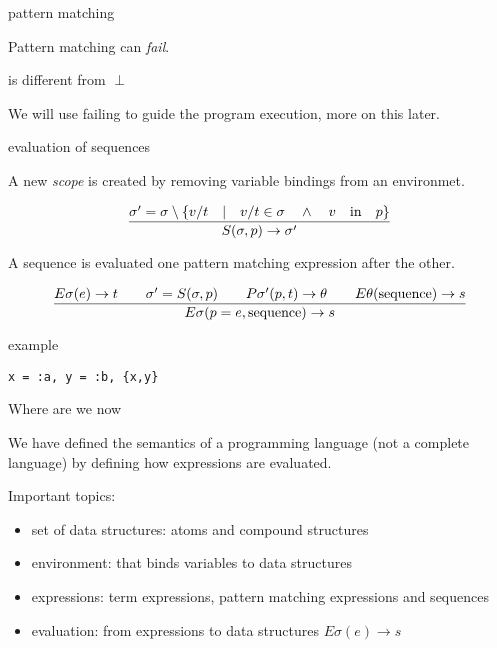 \begin{frame}{pattern matching}

\pause Pattern matching can {\em fail}. 

\pause\vspace{20pt}{\em fail} is different from $\perp$

We will use failing to guide the program execution, more on this later.

\end{frame}

\begin{frame}{evaluation of sequences}

  \pause  A new {\em scope} is created by removing variable bindings from an environmet.

  \vspace{10pt}\pause

$$\frac{\sigma' = \sigma \setminus \lbrace v/t \quad | \quad v/t \in \sigma \quad \wedge \quad  v \quad {\rm in} \quad p\rbrace}{S(\sigma, p) \rightarrow \sigma'}$$
  
\vspace{10pt}\pause

A sequence is evaluated one pattern matching expression after the other. 

$$\frac{   
  E\sigma(e) \rightarrow t
  \qquad \sigma' = S(\sigma, p)
  \qquad P\sigma'(p, t) \rightarrow \theta
  \qquad E\theta({\rm sequence}) \rightarrow s
}{E\sigma(p = e, {\rm sequence}) \rightarrow s}$$ 


\end{frame}

\begin{frame}{example}

   {\tt x = :a, y = :b, \{x,y\}}

\end{frame}



\begin{frame}{Where are we now}

We have defined the semantics of a programming language (not a
complete language) by defining how expressions are evaluated.

\vspace{20pt} 

\pause Important topics:

\vspace{10pt} 

\begin{itemize}
 \pause \item set of data structures: atoms and compound structures
 \pause \item environment: that binds variables to data structures
 \pause \item expressions: term expressions, pattern matching expressions and sequences
 \pause \item evaluation: from expressions to data structures $E\sigma(e) \rightarrow s$
\end{itemize}

\end{frame}

